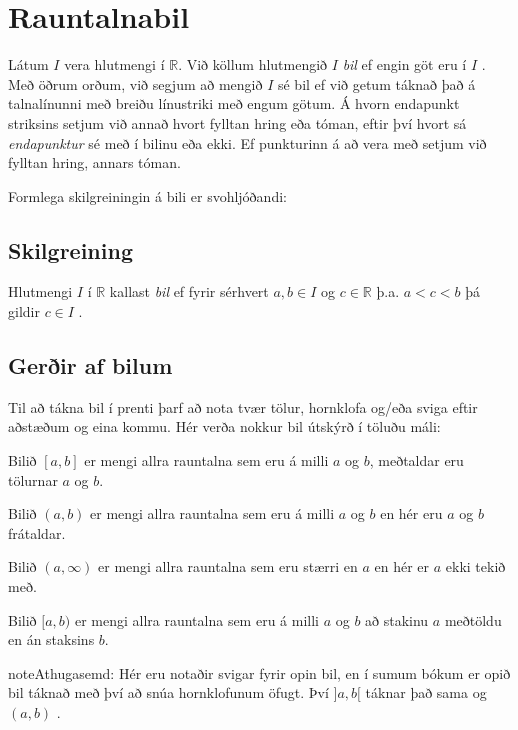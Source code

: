 \documentclass[a4paper,10pt,icelandic]{sphinxmanual}
\begin{document}
\section{Rauntalnabil}
\label{\detokenize{Kafli04:rauntalnabil}}
Látum \(I\) vera hlutmengi í \(\mathbb{R}\).
Við köllum hlutmengið \(I\) \textit{bil} ef engin göt eru í \(I\) .
Með öðrum orðum, við segjum að mengið \(I\) sé bil ef við getum táknað það á talnalínunni með breiðu línustriki með engum götum.
Á hvorn endapunkt striksins setjum við annað hvort fylltan hring eða tóman, eftir því hvort sá \textit{endapunktur} sé með í bilinu eða ekki.
Ef punkturinn á að vera með setjum við fylltan hring, annars tóman.


Formlega skilgreiningin á bili er svohljóðandi:


\subsection{Skilgreining}
\label{\detokenize{Kafli04:id1}}
Hlutmengi \(I\) í \(\mathbb{R}\) kallast \textit{bil} ef fyrir sérhvert \(a,b\in I\) og \(c\in\mathbb{R}\) þ.a. \(a<c<b\) þá gildir \(c\in I\) .


\subsection{Gerðir af bilum}
\label{\detokenize{Kafli04:gerir-af-bilum}}
Til að tákna bil í prenti þarf að nota tvær tölur, hornklofa og/eða sviga eftir aðstæðum og eina kommu. Hér verða nokkur bil útskýrð í töluðu máli:

Bilið \([a,b]\) er mengi allra rauntalna sem eru á milli \(a\) og \(b\), meðtaldar eru tölurnar \(a\) og \(b\).

Bilið \((a,b)\) er mengi allra rauntalna sem eru á milli \(a\) og \(b\) en hér eru \(a\) og \(b\) frátaldar.

Bilið \((a,\infty)\) er mengi allra rauntalna sem eru stærri en \(a\) en hér er \(a\) ekki tekið með.

Bilið \([a,b)\) er mengi allra rauntalna sem eru á milli \(a\) og \(b\) að stakinu \(a\) meðtöldu en án staksins \(b\).

\begin{sphinxadmonition}{note}{Athugasemd:}
Hér eru notaðir svigar fyrir opin bil, en í sumum bókum er opið bil táknað með því að snúa hornklofunum öfugt.
Því \(]a,b[\) táknar það sama og \((a,b)\) .
\end{sphinxadmonition}
\end{document}
